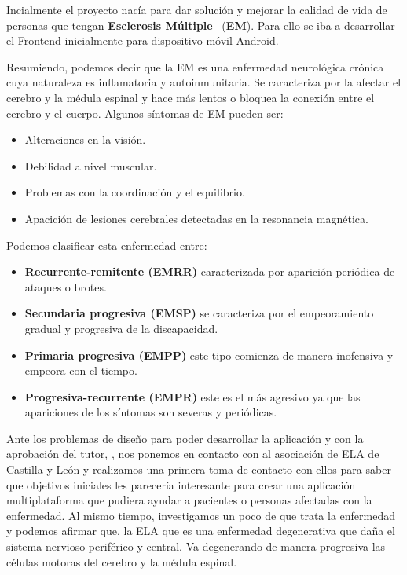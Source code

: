
Incialmente el proyecto nacía para dar solución y mejorar la calidad de vida de personas que tengan \textbf{Esclerosis Múltiple}~\cite{wiki:em,medlineplus:em} (\textbf{EM}). Para ello se iba a desarrollar el Frontend inicialmente para dispositivo móvil Android. 

Resumiendo, podemos decir que la EM es una enfermedad neurológica crónica cuya naturaleza es inflamatoria y autoinmunitaria. Se caracteriza por la afectar el cerebro y la médula espinal y hace más lentos o bloquea la conexión entre el cerebro y el cuerpo.
Algunos síntomas de EM pueden ser:
\begin{itemize}
\item Alteraciones en la visión.
\item Debilidad a nivel muscular.
\item Problemas con la coordinación y el equilibrio.
\item Apacición de lesiones cerebrales detectadas en la resonancia magnética.
\end{itemize}
Podemos clasificar esta enfermedad entre:
\begin{itemize}
\item \textbf{Recurrente-remitente (EMRR)} caracterizada por aparición periódica de ataques o brotes.
\item \textbf{Secundaria progresiva (EMSP)} se caracteriza por el empeoramiento gradual y progresiva de la discapacidad.
\item \textbf{Primaria progresiva (EMPP)} este tipo comienza de manera inofensiva y empeora con el tiempo.
\item \textbf{Progresiva-recurrente (EMPR)} este es el más agresivo ya que las apariciones de los síntomas son severas y periódicas.
\end{itemize}

Ante los problemas de diseño para poder desarrollar la aplicación y con la aprobación del tutor, {\nomtutor}, nos ponemos en contacto con al asociación de ELA de Castilla y León  y realizamos una primera toma de contacto con ellos para saber que objetivos iniciales les parecería interesante para crear una aplicación multiplataforma que pudiera ayudar a pacientes o personas afectadas con la enfermedad. Al mismo tiempo, investigamos un poco de que trata la enfermedad y podemos afirmar que, la ELA que es una enfermedad degenerativa que daña el sistema nervioso periférico y central. Va degenerando de manera progresiva las células motoras del cerebro y la médula espinal.


